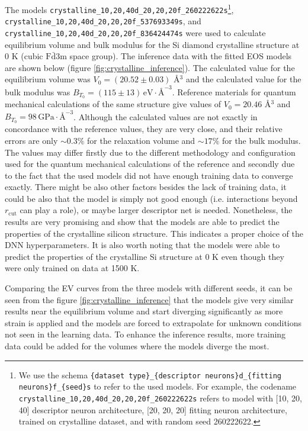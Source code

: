 The models \texttt{crystalline\_10,20,40d\_20,20,20f\_260222622s}\footnote{
  We use the schema \texttt{\{dataset type\}\_\{descriptor neurons\}d\_\{fitting neurons\}f\_\{seed\}s}
  to refer to the used models. For example, the codename
  \texttt{crystalline\_10,20,40d\_20,20,20f\_260222622s} refers to model with
  [10, 20, 40] descriptor neuron architecture, [20, 20, 20] fitting neuron
  architecture, trained on crystalline dataset, and with random seed
  260222622.
},
\texttt{cryst\-alline\_10,20,40d\_20,20,20f\_537693349s}, and
\texttt{crystalline\_10,20,\linebreak{}40d\_20,20,20f\_836424474s} were used to calculate
equilibrium volume and bulk modulus for the Si diamond crystalline structure
at 0 K (cubic $\mathrm{F}\bar{\mathrm{d}}\mathrm{3m}$ space group). The
inference data with the fitted EOS models are shown below (figure
\ref{fig:crystalline_inference}). The calculated value for the equilibrium
volume was $V_0 = (20.52 \pm 0.03)$ \AA$^3$ and the calculated value for the
bulk modulus was
$B_{T_0} = (115 \pm 13) \, \mathrm{eV} \cdot \text{\AA}^{-3}$. Reference
materials for quantum mechanical calculations of the same structure give
values of $V_0 = 20.46$ \AA$^3$ and
$B_{T_0} = 98 \, \mathrm{GPa} \cdot \text{\AA}^{-3}$\cite{osti_1190959}.
Although the calculated values are not exactly in concordance with the
reference values, they are very close, and their relative errors are
only $\sim 0.3\%$ for the relaxation volume and $\sim 17 \%$ for the bulk
modulus. The values may differ firstly due to the different methodology and
configuration used for the quantum mechanical calculations of the reference
and secondly due to the fact that the used models did not have enough training
data to converge exactly. There might be also other factors besides the lack
of training data, it could be also that the model is simply not good enough
(i.e. interactions beyond $r_\mathrm{cut}$ can play a role), or maybe larger
descriptor net is needed. Nonetheless, the results are very promising and show
that the models are able to predict the properties of the crystalline silicon
structure. This indicates a proper choice of the DNN hyperparameters. It is
also worth noting that the models were able to predict the properties of the
crystalline Si structure at 0 K even though they were only trained on data at
1500 K.

Comparing the EV curves from the three models with different seeds, it can be
seen from the figure \ref{fig:crystalline_inference} that the models give
very similar results near the equilibrium volume and start diverging
significantly as more strain is applied and the models are forced to extrapolate for unknown
conditions not seen in the learning data. To enhance the inference results,
more training data could be added for the volumes where the models diverge the
most.


